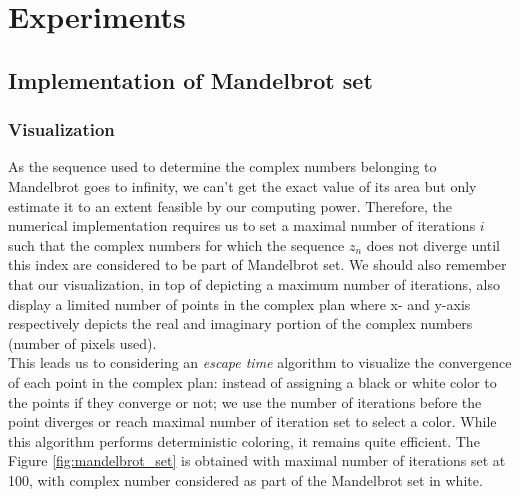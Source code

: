 \documentclass{article}
\begin{document}
    \newpage

    \section{Experiments}

    \subsection{Implementation of Mandelbrot set}
    \label{section:part_1_mandelbrot_set}

    \subsubsection*{Visualization}
    As the sequence used to determine the complex numbers belonging to Mandelbrot goes to infinity, we can't get the exact value of its area but only estimate it to an extent feasible by our computing power. Therefore, the numerical implementation requires us to set a maximal number of iterations $i$ such that the complex numbers for which the sequence $z_n$ does not diverge until this index are considered to be part of Mandelbrot set. We should also remember that our visualization, in top of depicting a maximum number of iterations, also display a limited number of points in the complex plan where x- and y-axis respectively depicts the real and imaginary portion of the complex numbers (number of pixels used).\\
    This leads us to considering an \emph{escape time} algorithm to visualize the convergence of each point in the complex plan: instead of assigning a black or white color to the points if they converge or not; we use the number of iterations before the point diverges or reach maximal number of iteration set to select a color. While this algorithm performs deterministic coloring, it remains quite efficient. The Figure \ref{fig:mandelbrot_set} is obtained with maximal number of iterations set at 100, with complex number considered as part of the Mandelbrot set in white.
\end{document}
